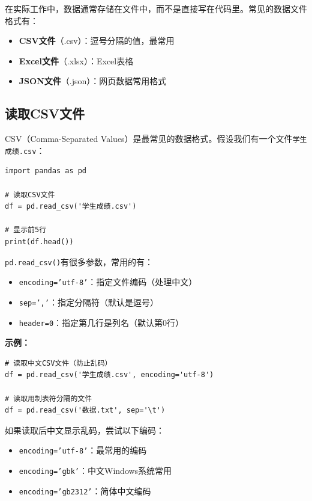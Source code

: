 \documentclass[12pt,a4paper]{article}
\begin{document}
在实际工作中，数据通常存储在文件中，而不是直接写在代码里。常见的数据文件格式有：

\begin{itemize}
    \item \textbf{CSV文件}（.csv）：逗号分隔的值，最常用
    \item \textbf{Excel文件}（.xlsx）：Excel表格
    \item \textbf{JSON文件}（.json）：网页数据常用格式
\end{itemize}

\subsection{读取CSV文件}

CSV（Comma-Separated Values）是最常见的数据格式。假设我们有一个文件\texttt{学生成绩.csv}：

\begin{lstlisting}[caption={读取CSV文件}]
import pandas as pd

# 读取CSV文件
df = pd.read_csv('学生成绩.csv')

# 显示前5行
print(df.head())
\end{lstlisting}

\begin{knowledgebox}
\texttt{pd.read\_csv()}有很多参数，常用的有：

\begin{itemize}
    \item \texttt{encoding='utf-8'}：指定文件编码（处理中文）
    \item \texttt{sep=','}：指定分隔符（默认是逗号）
    \item \texttt{header=0}：指定第几行是列名（默认第0行）
\end{itemize}

\textbf{示例：}
\begin{lstlisting}
# 读取中文CSV文件（防止乱码）
df = pd.read_csv('学生成绩.csv', encoding='utf-8')

# 读取用制表符分隔的文件
df = pd.read_csv('数据.txt', sep='\t')
\end{lstlisting}
\end{knowledgebox}

\begin{tipbox}[中文乱码怎么办？]
如果读取后中文显示乱码，尝试以下编码：
\begin{itemize}
    \item \texttt{encoding='utf-8'}：最常用的编码
    \item \texttt{encoding='gbk'}：中文Windows系统常用
    \item \texttt{encoding='gb2312'}：简体中文编码
\end{itemize}
\end{tipbox}
\end{document}
